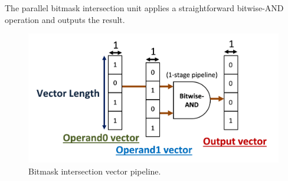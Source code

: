 The parallel bitmask intersection unit applies a straightforward bitwise-AND operation and outputs the result.

\begin{figure}[H]
    \centering
    \includegraphics[width=\linewidth]{figures/bitmask_intersection.png}
    \caption{Bitmask intersection vector pipeline.}
    \label{fig:bitmask_intersection}
\end{figure}